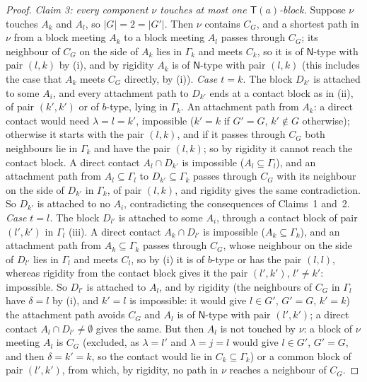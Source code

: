 \documentclass[11pt]{amsart}
\theoremstyle{definition}
\newcommand{\T}{\mathsf{T}}
\newcommand{\N}{\mathsf{N}}
\begin{document}
\begin{proof}
\emph{Claim 3: every component $\nu$ touches at most one $\T(a)$-block.} Suppose $\nu$ touches $A_k$ and $A_l$, so $|G|=2=|G'|$. Then $\nu$ contains $C_G$, and a shortest path in $\nu$ from a block meeting $A_k$ to a block meeting $A_l$ passes through $C_G$; its neighbour of $C_G$ on the side of $A_k$ lies in $\Gamma_k$ and meets $C_k$, so it is of $\N$-type with pair $(l,k)$ by (i), and by rigidity $A_k$ is of $\N$-type with pair $(l,k)$ (this includes the case that $A_k$ meets $C_G$ directly, by (i)). \emph{Case $t=k$.} The block $D_{k'}$ is attached to some $A_i$, and every attachment path to $D_{k'}$ ends at a contact block as in (ii), of pair $(k',k')$ or of $b$-type, lying in $\Gamma_k$. An attachment path from $A_k$: a direct contact would need $\lambda=l=k'$, impossible ($k'=k$ if $G'=G$, $k'\notin G$ otherwise); otherwise it starts with the pair $(l,k)$, and if it passes through $C_G$ both neighbours lie in $\Gamma_k$ and have the pair $(l,k)$; so by rigidity it cannot reach the contact block. A direct contact $A_l\cap D_{k'}$ is impossible ($A_l\subseteq\Gamma_l$), and an attachment path from $A_l\subseteq\Gamma_l$ to $D_{k'}\subseteq\Gamma_k$ passes through $C_G$ with its neighbour on the side of $D_{k'}$ in $\Gamma_k$, of pair $(l,k)$, and rigidity gives the same contradiction. So $D_{k'}$ is attached to no $A_i$, contradicting the consequences of Claims~1 and~2. \emph{Case $t=l$.} The block $D_{l'}$ is attached to some $A_i$, through a contact block of pair $(l',k')$ in $\Gamma_l$ (iii). A direct contact $A_k\cap D_{l'}$ is impossible ($A_k\subseteq\Gamma_k$), and an attachment path from $A_k\subseteq\Gamma_k$ passes through $C_G$, whose neighbour on the side of $D_{l'}$ lies in $\Gamma_l$ and meets $C_l$, so by (i) it is of $b$-type or has the pair $(l,l)$, whereas rigidity from the contact block gives it the pair $(l',k')$, $l'\ne k'$: impossible. So $D_{l'}$ is attached to $A_l$, and by rigidity (the neighbours of $C_G$ in $\Gamma_l$ have $\delta=l$ by (i), and $k'=l$ is impossible: it would give $l\in G'$, $G'=G$, $k'=k$) the attachment path avoids $C_G$ and $A_l$ is of $\N$-type with pair $(l',k')$; a direct contact $A_l\cap D_{l'}\ne\emptyset$ gives the same. But then $A_l$ is not touched by $\nu$: a block of $\nu$ meeting $A_l$ is $C_G$ (excluded, as $\lambda=l'$ and $\lambda=j=l$ would give $l\in G'$, $G'=G$, and then $\delta=k'=k$, so the contact would lie in $C_k\subseteq\Gamma_k$) or a common block of pair $(l',k')$, from which, by rigidity, no path in $\nu$ reaches a neighbour of $C_G$.


\end{proof}
\end{document}
